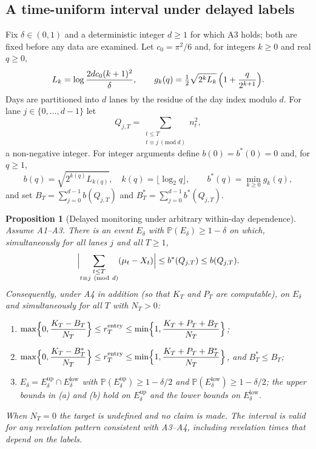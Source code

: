 \documentclass[11pt]{article}
\newtheorem{proposition}{Proposition}
\theoremstyle{remark}
\newcommand{\Prob}{\mathbb{P}}
\newcommand{\rentry}{r_T^{\mathrm{entry}}}
\begin{document}
\subsection{A time-uniform interval under delayed labels}

Fix $\delta\in(0,1)$ and a deterministic integer $d\ge1$ for which A3 holds; both are fixed
before any data are examined. Let $c_0=\pi^2/6$ and, for integers $k\ge0$ and real $q\ge0$,
\[
L_k=\log\frac{2dc_0(k+1)^2}{\delta},\qquad
g_k(q)=\tfrac12\sqrt{2^kL_k}\,\Bigl(1+\frac{q}{2^{k+1}}\Bigr).
\]
Days are partitioned into $d$ lanes by the residue of the day index modulo $d$. For lane
$j\in\{0,\dots,d-1\}$ let
\[
Q_{j,T}=\sum_{\substack{t\le T\\ t\equiv j\ (\mathrm{mod}\ d)}}n_t^2 ,
\]
a non-negative integer. For integer arguments define $b(0)=b^*(0)=0$ and, for $q\ge1$,
\[
b(q)=\sqrt{2^{k(q)}L_{k(q)}},\quad k(q)=\lfloor\log_2q\rfloor,\qquad
b^*(q)=\min_{k\ge0}g_k(q),
\]
and set $B_T=\sum_{j=0}^{d-1}b(Q_{j,T})$ and $B_T^*=\sum_{j=0}^{d-1}b^*(Q_{j,T})$.

\begin{proposition}[Delayed monitoring under arbitrary within-day dependence]
\label{prop:monitor}
Assume A1--A3. There is an event $E_\delta$ with $\Prob(E_\delta)\ge1-\delta$ on which,
simultaneously for all lanes $j$ and all $T\ge1$,
\begin{equation}
\Bigl|\sum_{\substack{t\le T\\ t\equiv j\ (\mathrm{mod}\ d)}}(\mu_t-X_t)\Bigr|
\le b^*(Q_{j,T})\le b(Q_{j,T}).
\label{eq:lane}
\end{equation}
Consequently, under A4 in addition (so that $K_T$ and $P_T$ are computable), on $E_\delta$ and
simultaneously for all $T$ with $N_T>0$:
\begin{enumerate}
\item[(a)] $\displaystyle\max\Bigl\{0,\frac{K_T-B_T}{N_T}\Bigr\}\le\rentry\le
\min\Bigl\{1,\frac{K_T+P_T+B_T}{N_T}\Bigr\}$;
\item[(b)] $\displaystyle\max\Bigl\{0,\frac{K_T-B_T^*}{N_T}\Bigr\}\le\rentry\le
\min\Bigl\{1,\frac{K_T+P_T+B_T^*}{N_T}\Bigr\}$, and $B_T^*\le B_T$;
\item[(c)] $E_\delta=E_\delta^{\mathrm{up}}\cap E_\delta^{\mathrm{low}}$ with
$\Prob(E_\delta^{\mathrm{up}})\ge1-\delta/2$ and $\Prob(E_\delta^{\mathrm{low}})\ge1-\delta/2$;
the upper bounds in (a) and (b) hold on $E_\delta^{\mathrm{up}}$ and the lower bounds on
$E_\delta^{\mathrm{low}}$.
\end{enumerate}
When $N_T=0$ the target is undefined and no claim is made. The interval is valid for any
revelation pattern consistent with A3--A4, including revelation times that depend on the labels.
\end{proposition}
\end{document}
